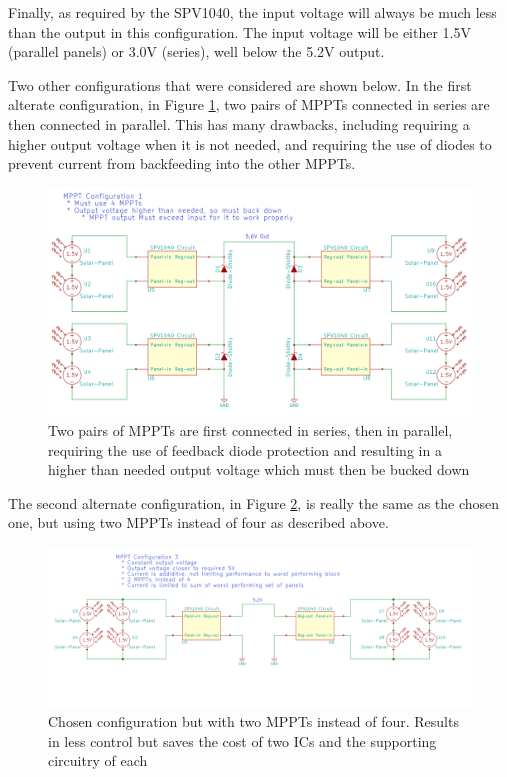\documentclass{article}
\numberwithin{figure}{section}
\numberwithin{equation}{section}
\begin{document}
{\bigskip
Finally, as required by the SPV1040, the input voltage will always be much less than the output in this configuration. The input voltage will be either 1.5V (parallel panels) or 3.0V (series), well below the 5.2V output.

\bigskip
Two other configurations that were considered are shown below. In the first alterate configuration, in Figure \ref{fig:mppt_config1}, two pairs of MPPTs connected in series are then connected in parallel. This has many drawbacks, including requiring a higher output voltage when it is not needed, and requiring the use of diodes to prevent current from backfeeding into the other MPPTs.

\begin{figure}[H]
  \centering
  \includegraphics[width=1.0\textwidth]{MPPTConfig1}
  \caption{Two pairs of MPPTs are first connected in series, then in parallel, requiring the use of feedback diode protection and resulting in a higher than needed output voltage which must then be bucked down}
  \label{fig:mppt_config1}
\end{figure}

The second alternate configuration, in Figure \ref{fig:mppt_config3}, is really the same as the chosen one, but using two MPPTs instead of four as described above.

\begin{figure}[H]
  \centering
  \includegraphics[width=1.0\textwidth]{MPPTConfig3}
  \caption{Chosen configuration but with two MPPTs instead of four. Results in less control but saves the cost of two ICs and the supporting circuitry of each}
  \label{fig:mppt_config3}
\end{figure}

}
\end{document}
